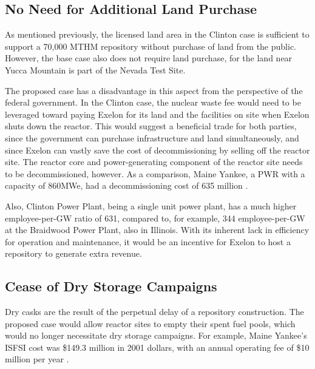 \subsection{No Need for Additional Land Purchase}



  
  As mentioned previously, the licensed land area in the Clinton case is 
  sufficient to support a 70,000 MTHM repository without purchase of land from 
  the public.  However, the base case also does not require land purchase, for the land near 
  Yucca Mountain is part of the Nevada Test Site. 
  
  The proposed case has a disadvantage in this aspect from the perspective of 
  the federal government. In the Clinton case, the nuclear waste fee would need 
  to be leveraged toward paying Exelon for its land and the facilities on site 
  when Exelon shuts down the reactor.
  This would suggest a beneficial trade for both parties, since the government
  can purchase infrastructure and land simultaneously, and since Exelon can vastly
  save the cost of decommissioning by selling off the reactor site. The reactor
  core and power-generating component of the reactor site needs to be decommissioned,
  however. As a comparison, Maine Yankee, a PWR with a capacity of 860MWe, had a
  decommissioning cost of 635 million \cite{Maine_Yankee}.


Also, Clinton Power Plant, being a single unit power plant, has a much higher
 employee-per-GW ratio of 631, compared to, for example, 344 employee-per-GW at
the Braidwood Power Plant, also in Illinois. %
With its inherent lack in efficiency for operation and maintenance, it would be
an incentive for Exelon to host a repository to generate extra revenue. 

 
\subsection{Cease of Dry Storage Campaigns}

Dry casks are the result of the perpetual delay of a repository construction.
The proposed case would allow reactor sites to empty their spent fuel pools, which
would no longer necessitate dry storage campaigns. For example, Maine Yankee's 
\gls{ISFSI} cost was \$149.3 million in 2001 dollars, with an annual operating fee
of \$10 million per year \cite{IAEA_2009}. 

